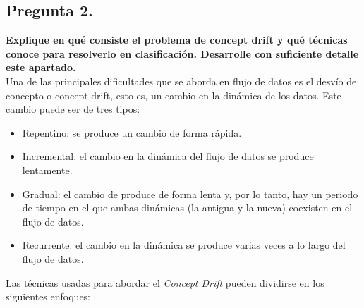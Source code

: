 \documentclass[11pt]{article}
\begin{document}
\subsection{Pregunta 2.}

\textbf{Explique en qué consiste el problema de concept drift y qué técnicas conoce para resolverlo en clasificación. Desarrolle con suficiente detalle este apartado.} \\

Una de las principales dificultades que se aborda en flujo de datos es el desvío de concepto o concept drift, esto es, un cambio en la dinámica de los datos. Este cambio puede ser de tres tipos:

\begin{itemize}
	\item Repentino: se produce un cambio de forma rápida.
	\item Incremental: el cambio en la dinámica del flujo de datos se produce lentamente.
	\item Gradual: el cambio de produce de forma lenta y, por lo tanto, hay un periodo de tiempo en el que ambas dinámicas (la antigua y la nueva) coexisten en el flujo de datos.
	\item Recurrente: el cambio en la dinámica se produce varias veces a lo largo del flujo de datos.
\end{itemize}

Las técnicas usadas para abordar el \textit{Concept Drift} pueden dividirse en los siguientes enfoques:
\end{document}
